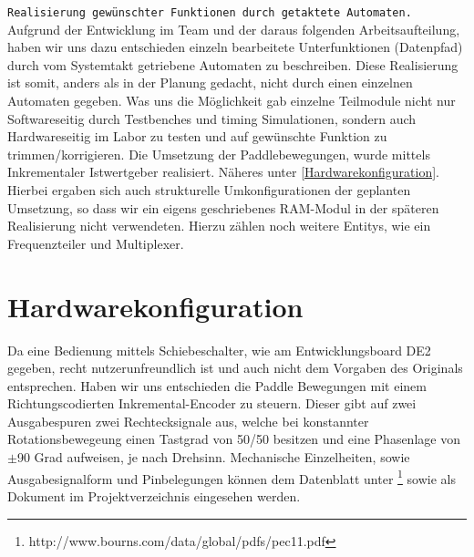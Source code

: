 \documentclass{article}
\begin{document}
\texttt{Realisierung gewünschter Funktionen durch getaktete Automaten.}
\newline
Aufgrund der Entwicklung im Team und der daraus folgenden Arbeitsaufteilung, haben wir uns dazu entschieden einzeln bearbeitete Unterfunktionen
(Datenpfad) durch vom Systemtakt getriebene Automaten zu beschreiben. Diese Realisierung ist somit, anders als in der Planung gedacht, nicht durch einen
einzelnen Automaten gegeben. Was uns die Möglichkeit gab einzelne Teilmodule nicht nur Softwareseitig durch Testbenches und timing Simulationen, sondern 
auch Hardwareseitig im Labor zu testen und auf gewünschte Funktion zu trimmen/korrigieren.
Die Umsetzung der Paddlebewegungen, wurde mittels Inkrementaler Istwertgeber realisiert. Näheres unter \ref{Hardwarekonfiguration}.
Hierbei ergaben sich auch strukturelle Umkonfigurationen der geplanten Umsetzung, so dass wir ein eigens geschriebenes RAM-Modul in der späteren Realisierung
nicht verwendeten. Hierzu zählen noch weitere Entitys, wie ein Frequenzteiler und Multiplexer.
\vspace{7.5mm}

\section{Hardwarekonfiguration}
\label{Hardwarekonfiguration}
Da eine Bedienung mittels Schiebeschalter, wie am Entwicklungsboard DE2 gegeben, recht nutzerunfreundlich ist und auch nicht dem Vorgaben des Originals entsprechen.
Haben wir uns entschieden die Paddle Bewegungen mit einem Richtungscodierten Inkremental-Encoder zu steuern.
\newline
Dieser gibt auf zwei Ausgabespuren zwei Rechtecksignale aus, welche bei konstannter Rotationsbewegeung einen Tastgrad von 50/50 besitzen und eine Phasenlage von
\(\pm\)90 Grad aufweisen, je nach Drehsinn. Mechanische Einzelheiten, sowie Ausgabesignalform und Pinbelegungen können dem Datenblatt unter 
\footnote{http://www.bourns.com/data/global/pdfs/pec11.pdf} sowie als Dokument im Projektverzeichnis eingesehen werden.
\end{document}
